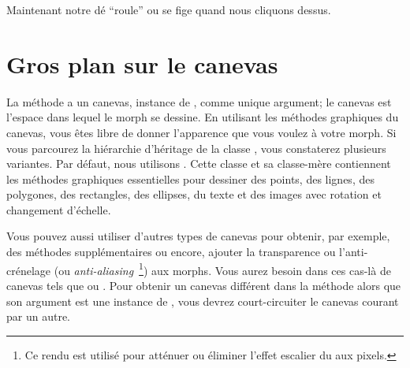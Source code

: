\documentclass[a4paper,10pt,twoside]{book}
\begin{document}
Maintenant notre dé ``roule'' ou se fige quand nous cliquons dessus.



\section{Gros plan sur le canevas}

La méthode  a un canevas, instance de
, comme unique argument;
le canevas est l'espace dans lequel le morph se dessine.
En utilisant les méthodes graphiques du canevas, vous êtes libre
de donner l'apparence que vous voulez à votre morph.
Si vous parcourez la hiérarchie d'héritage de la classe
, vous constaterez plusieurs variantes. Par défaut, nous
utilisons . Cette classe et sa classe-mère
 contiennent les méthodes graphiques essentielles pour
dessiner des points, des lignes, des polygones, des rectangles, des
ellipses, du texte et des images avec rotation et changement d'échelle. 

Vous pouvez aussi utiliser d'autres types de canevas pour obtenir, par
exemple, des méthodes supplémentaires ou encore, ajouter la
transparence ou l'anti-crénelage (ou
\emph{anti-aliasing}~\footnote{Ce rendu est utilisé pour atténuer
  ou éliminer l'effet escalier du aux pixels.}) aux morphs.  
Vous aurez besoin dans ces cas-là de canevas tels que
 ou .
Pour obtenir un canevas différent dans la méthode 
alors que son argument est une instance de , vous devrez
court-circuiter le canevas courant par un autre. 
\end{document}
